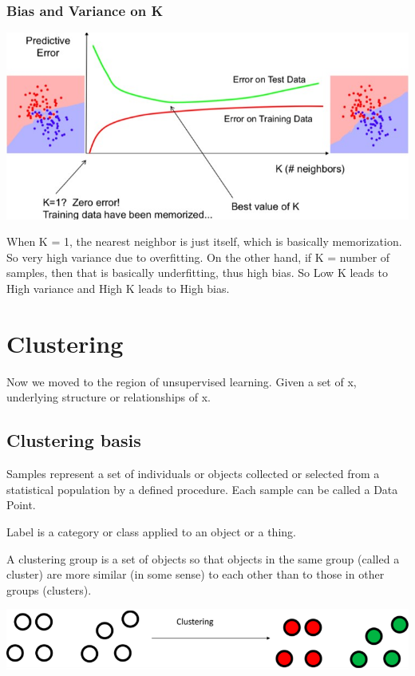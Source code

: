 \documentclass[letterpaper,12pt]{article}
\begin{document}
\subsubsection{Bias and Variance on K}
\includegraphics*[scale=0.7]{Image/KNN tunning K.jpg}

When K = 1, the nearest neighbor is just itself, which is basically memorization. So very high variance due to overfitting. On the other hand, if K = number of samples, then that is basically underfitting, thus high bias. So Low K leads to High variance and High K leads to High bias. 


\section{Clustering}

Now we moved to the region of unsupervised learning. Given a set of x, underlying structure or relationships of x.

\subsection{Clustering basis}
Samples represent a set of individuals or objects collected or selected from a statistical population by a defined procedure. Each sample can be called a Data Point. 

Label is a category or class applied to an object or a thing. 

A clustering group is a set of objects so that objects in the same group (called a cluster) are more similar (in some sense) to each other than to those in other groups (clusters).

\includegraphics[scale=0.8]{Image/Clustering basics example.png}
\end{document}
